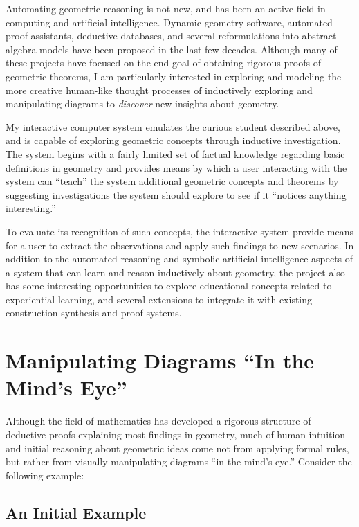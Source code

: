 Automating geometric reasoning is not new, and has been an active
field in computing and artificial intelligence.  Dynamic geometry
software, automated proof assistants, deductive databases, and several
reformulations into abstract algebra models have been proposed in the
last few decades.  Although many of these projects have focused on the
end goal of obtaining rigorous proofs of geometric theorems, I am
particularly interested in exploring and modeling the more creative
human-like thought processes of inductively exploring and manipulating
diagrams to \emph{discover} new insights about geometry.

My interactive computer system emulates the curious student described
above, and is capable of exploring geometric concepts through
inductive investigation.  The system begins with a fairly limited set
of factual knowledge regarding basic definitions in geometry and
provides means by which a user interacting with the system can
``teach'' the system additional geometric concepts and theorems by
suggesting investigations the system should explore to see if it
``notices anything interesting.''

To evaluate its recognition of such concepts, the interactive system
provide means for a user to extract the observations and apply such
findings to new scenarios.  In addition to the automated reasoning and
symbolic artificial intelligence aspects of a system that can learn
and reason inductively about geometry, the project also has some
interesting opportunities to explore educational concepts related to
experiential learning, and several extensions to integrate it with
existing construction synthesis and proof systems.

\section{Manipulating Diagrams ``In the Mind's Eye''}

Although the field of mathematics has developed a rigorous structure
of deductive proofs explaining most findings in geometry, much of
human intuition and initial reasoning about geometric ideas come not
from applying formal rules, but rather from visually manipulating
diagrams ``in the mind's eye.'' Consider the following example:

\subsection{An Initial Example}

